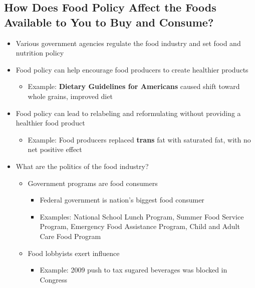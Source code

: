 \documentclass[12pt]{article}
\begin{document}
        \subsection{How Does Food Policy Affect the Foods Available to You to Buy and Consume?}
            \begin{itemize}
                \item Various government agencies regulate the food industry and set food and nutrition policy
                \item Food policy can help encourage food producers to create healthier products
                    \begin{itemize}
                        \item Example: \textbf{Dietary Guidelines for Americans} caused shift toward whole grains, improved diet
                    \end{itemize}
                \item Food policy can lead to relabeling and reformulating without providing a healthier food product
                    \begin{itemize}
                        \item Example: Food producers replaced \textbf{trans} fat with saturated fat, with no net positive effect
                    \end{itemize}
                \item What are the politics of the food industry?
                    \begin{itemize}
                        \item Government programs are food consumers
                            \begin{itemize}
                                \item Federal government is nation's biggest food consumer
                                \item Examples: National School Lunch Program, Summer Food Service Program, Emergency Food Assistance Program, Child and Adult Care Food Program
                            \end{itemize}
                        \item Food lobbyists exert influence
                            \begin{itemize}
                                \item Example: 2009 push to tax sugared beverages was blocked in Congress
                            \end{itemize}
                    \end{itemize}
            \end{itemize}
\end{document}
